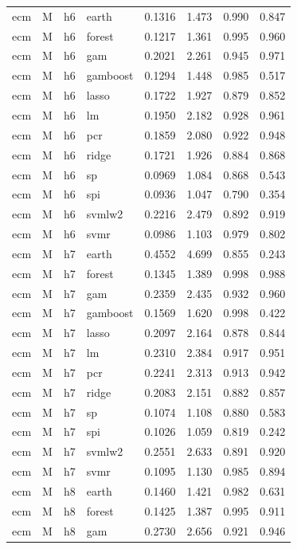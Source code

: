 \begin{ThreePartTable}
\begin{longtable}[t]{llclcccc}
\addlinespace
ecm & M & h6 & earth & 0.1316 & 1.473 & 0.990 & 0.847\\
ecm & M & h6 & forest & 0.1217 & 1.361 & 0.995 & 0.960\\
ecm & M & h6 & gam & 0.2021 & 2.261 & 0.945 & 0.971\\
ecm & M & h6 & gamboost & 0.1294 & 1.448 & 0.985 & 0.517\\
ecm & M & h6 & lasso & 0.1722 & 1.927 & 0.879 & 0.852\\
ecm & M & h6 & lm & 0.1950 & 2.182 & 0.928 & 0.961\\
ecm & M & h6 & pcr & 0.1859 & 2.080 & 0.922 & 0.948\\
ecm & M & h6 & ridge & 0.1721 & 1.926 & 0.884 & 0.868\\
ecm & M & h6 & sp & 0.0969 & 1.084 & 0.868 & 0.543\\
ecm & M & h6 & spi & 0.0936 & 1.047 & 0.790 & 0.354\\
ecm & M & h6 & svmlw2 & 0.2216 & 2.479 & 0.892 & 0.919\\
ecm & M & h6 & svmr & 0.0986 & 1.103 & 0.979 & 0.802\\
\addlinespace
ecm & M & h7 & earth & 0.4552 & 4.699 & 0.855 & 0.243\\
ecm & M & h7 & forest & 0.1345 & 1.389 & 0.998 & 0.988\\
ecm & M & h7 & gam & 0.2359 & 2.435 & 0.932 & 0.960\\
ecm & M & h7 & gamboost & 0.1569 & 1.620 & 0.998 & 0.422\\
ecm & M & h7 & lasso & 0.2097 & 2.164 & 0.878 & 0.844\\
ecm & M & h7 & lm & 0.2310 & 2.384 & 0.917 & 0.951\\
ecm & M & h7 & pcr & 0.2241 & 2.313 & 0.913 & 0.942\\
ecm & M & h7 & ridge & 0.2083 & 2.151 & 0.882 & 0.857\\
ecm & M & h7 & sp & 0.1074 & 1.108 & 0.880 & 0.583\\
ecm & M & h7 & spi & 0.1026 & 1.059 & 0.819 & 0.242\\
ecm & M & h7 & svmlw2 & 0.2551 & 2.633 & 0.891 & 0.920\\
ecm & M & h7 & svmr & 0.1095 & 1.130 & 0.985 & 0.894\\
\addlinespace
ecm & M & h8 & earth & 0.1460 & 1.421 & 0.982 & 0.631\\
ecm & M & h8 & forest & 0.1425 & 1.387 & 0.995 & 0.911\\
ecm & M & h8 & gam & 0.2730 & 2.656 & 0.921 & 0.946\\

\end{longtable}
\end{ThreePartTable}

